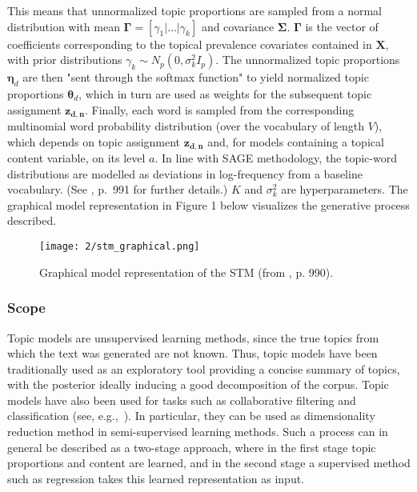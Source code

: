 \documentclass[12pt]{article}
\begin{document}
\noindent
This means that unnormalized topic proportions are sampled from a normal distribution with mean $\boldsymbol{\Gamma} = [\gamma_1|\dots|\gamma_k]$ and covariance $\boldsymbol{\Sigma}$. $\boldsymbol{\Gamma}$ is the vector of coefficients corresponding to the topical prevalence covariates contained in $\boldsymbol{X}$, with prior distributions $\gamma_k \sim N_p(0, \sigma_k^2I_p)$. The unnormalized topic proportions $\boldsymbol{\eta}_d$ are then "sent through the softmax function" to yield normalized topic proportions $\boldsymbol{\theta}_d$, which in turn are used as weights for the subsequent topic assignment $\boldsymbol{z_{d,n}}$. Finally, each word is sampled from the corresponding multinomial word probability distribution (over the vocabulary of length $V$), which depends on topic assignment $\boldsymbol{z_{d,n}}$ and, for models containing a topical content variable, on its level $a$. In line with SAGE methodology, the topic-word distributions are modelled as deviations in log-frequency from a baseline vocabulary. (See \cite{roberts2016model}, p.\ 991 for further details.) $K$ and $\sigma_k^2$ are hyperparameters. The graphical model representation in Figure 1 below visualizes the generative process described.


\begin{figure}[h!]
  \centering
  \captionsetup{justification=centering,margin=2cm}
  \texttt{[image: 2/stm\_graphical.png]}
  \caption{Graphical model representation of the STM (from \cite{roberts2016model}, p. 990).}
  \label{fig:graphical_model}
\end{figure}

\subsubsection*{Scope}

Topic models are unsupervised learning methods, since the true topics from which the text was generated are not known. Thus, topic models have been traditionally used as an exploratory tool providing a concise summary of topics, with the posterior ideally inducing a good decomposition of the corpus. Topic models have also been used for tasks such as collaborative filtering and classification (see, e.g.,\ \citealp{blei2003latent}). In particular, they can be used as dimensionality reduction method in semi-supervised learning methods. Such a process can in general be described as a two-stage approach, where in the first stage topic proportions and content are learned, and in the second stage a supervised method such as regression takes this learned representation as input. 
\end{document}
